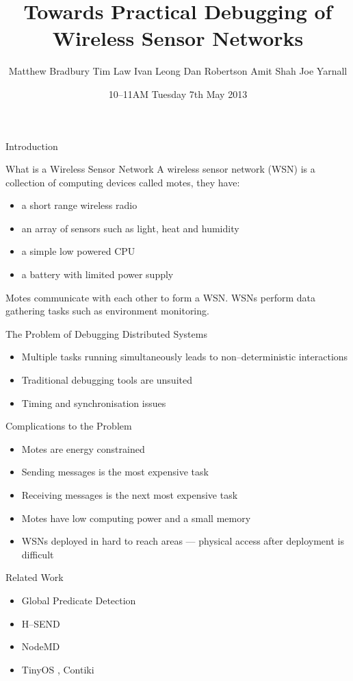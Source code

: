 \documentclass[usenames,dvipsnames]{beamer}
\title{Towards Practical Debugging of Wireless Sensor Networks}
\author[M.~Bradbury, T.~Law, I.~Leon, D.~Robertson, A.~Shah, J.~Yarnall]{Matthew Bradbury\newline
Tim Law\newline
Ivan Leong\newline
Dan Robertson\newline
Amit Shah\newline
Joe Yarnall}
\institute{CS407: Fourth Year Project}
\date{10--11AM Tuesday 7th May 2013}
\newcommand{\subtitleframe}[1]{\begin{frame}\begin{block}{\centering\Large \vspace{1em} #1 \vspace{1em}}\end{block}\end{frame}}
\begin{document}
\begin{frame}
\titlepage
\end{frame}

\subtitleframe{Introduction}

\begin{frame}{What is a Wireless Sensor Network}
A wireless sensor network (WSN) is a collection of computing devices called motes, they have:
	\begin{itemize}
		\item a short range wireless radio
		\item an array of sensors such as light, heat and humidity
		\item a simple low powered CPU
		\item a battery with limited power supply
	\end{itemize}
Motes communicate with each other to form a WSN.
WSNs perform data gathering tasks such as environment monitoring.
\end{frame}

\begin{frame}{The Problem of Debugging Distributed Systems}
	\begin{itemize}
		\item Multiple tasks running simultaneously leads to non--deterministic interactions
		\item Traditional debugging tools are unsuited
		\item Timing and synchronisation issues
	\end{itemize}
\end{frame}

\begin{frame}{Complications to the Problem}
	\begin{itemize}
		\item Motes are energy constrained
		\item Sending messages is the most expensive task
		\item Receiving messages is the next most expensive task \cite{Shnayder04}
		\item Motes have low computing power and a small memory
		\item WSNs deployed in hard to reach areas --- physical access after deployment is difficult \cite{herbert2007adaptive}
	\end{itemize}
\end{frame}

\begin{frame}{Related Work}
	\begin{itemize}
		\item Global Predicate Detection \cite{553309}
		\item H--SEND \cite{herbert2007adaptive}
		\item NodeMD \cite{NodeMD}
		\item TinyOS \cite{tinyos}, Contiki
	\end{itemize}
\end{frame}
\end{document}
